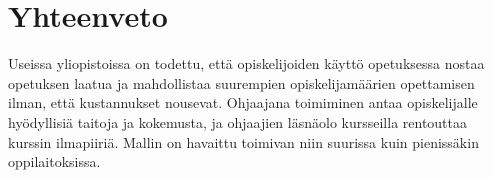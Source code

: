 \documentclass[finnish]{tktltiki2}
\theoremstyle{definition}
\theoremstyle{remark}
\begin{document}
\section{Yhteenveto}
Useissa yliopistoissa on todettu, että opiskelijoiden käyttö opetuksessa nostaa opetuksen laatua ja mahdollistaa suurempien opiskelijamäärien opettamisen ilman, että kustannukset nousevat. Ohjaajana toimiminen antaa opiskelijalle hyödyllisiä taitoja ja kokemusta, ja ohjaajien läsnäolo kursseilla rentouttaa kurssin ilmapiiriä. Mallin on havaittu toimivan niin suurissa kuin pienissäkin oppilaitoksissa.




\end{document}
